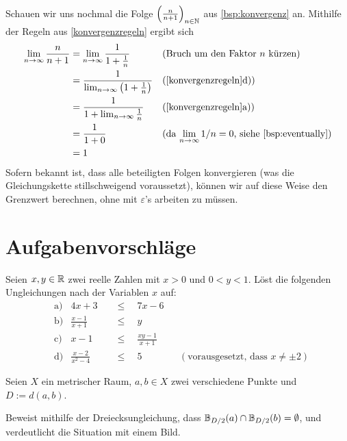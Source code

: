 \begin{bsp}
    Schauen wir uns nochmal die Folge $\left(\frac{n}{n+1}\right)_{n\in \mathbb N}$ aus \cref{bsp:konvergenz} an. Mithilfe der Regeln aus \cref{konvergenzregeln} ergibt sich
    \begin{align*}
        \lim_{n\to\infty} \frac{n}{n+1} & = \lim_{n\to\infty} \frac{1}{1+\frac{1}{n}} && (\text{Bruch um den Faktor $n$ kürzen}) \\
        & = \frac{1}{\lim_{n\to\infty} \left(1+\frac{1}{n}\right)} && (\text{\cref{konvergenzregeln}d)}) \\
        & = \frac{1}{1+\lim_{n\to\infty} \frac{1}{n}} && (\text{\cref{konvergenzregeln}a)}) \\
        & = \frac{1}{1+0} && (\text{da $\lim_{n\to\infty} 1/n=0$, siehe \cref{bsp:eventually}}) \\
        & = 1
    \end{align*}
    Sofern bekannt ist, dass alle beteiligten Folgen konvergieren (was die Gleichungskette stillschweigend voraussetzt), können wir auf diese Weise den Grenzwert berechnen, ohne mit $\varepsilon$'s arbeiten zu müssen.
\end{bsp}





\clearpage
\section{Aufgabenvorschläge}


\begin{aufg}
    Seien $x,y\in \mathbb R$ zwei reelle Zahlen mit $x>0$ und $0<y<1$. Löst die folgenden Ungleichungen nach der Variablen $x$ auf:
    \begin{align*}
        &\text{a)} & 4x + 3 \quad&\le\quad 7x-6 \\[0.5em]
        &\text{b)} & \frac{x-1}{x+1} \quad&\le\quad y \\[0.5em]
        &\text{c)} & x-1 \quad&\le\quad \frac{xy-1}{x+1} \\[0.5em]
        &\text{d)} & \frac{x-2}{x^2-4} \quad&\le\quad 5 && (\text{vorausgesetzt, dass $x\neq \pm 2$})
    \end{align*}
\end{aufg}


\begin{aufg}
    Seien $X$ ein metrischer Raum, $a,b\in X$ zwei verschiedene Punkte und $D:=d(a,b)$.
    
    Beweist mithilfe der Dreiecksungleichung, dass $\mathbb B_{D/2}(a)\cap \mathbb B_{D/2}(b)=\emptyset$, und verdeutlicht die Situation mit einem Bild.
\end{aufg}


